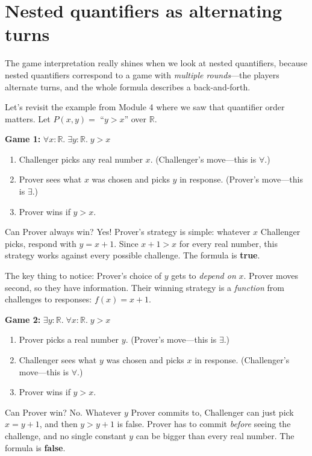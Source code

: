 \documentclass[11pt]{article}
\begin{document}
\section{Nested quantifiers as alternating turns}

The game interpretation really shines when we look at nested quantifiers, because nested quantifiers correspond to a game with \emph{multiple rounds}---the players alternate turns, and the whole formula describes a back-and-forth.

Let's revisit the example from Module 4 where we saw that quantifier order matters. Let $P(x, y) = $ ``$y > x$'' over $\mathbb{R}$.

\medskip
\noindent\textbf{Game 1:} $\forall x : \mathbb{R}.\; \exists y : \mathbb{R}.\; y > x$

\begin{enumerate}
  \item Challenger picks any real number $x$. (Challenger's move---this is $\forall$.)
  \item Prover sees what $x$ was chosen and picks $y$ in response. (Prover's move---this is $\exists$.)
  \item Prover wins if $y > x$.
\end{enumerate}

Can Prover always win? Yes! Prover's strategy is simple: whatever $x$ Challenger picks, respond with $y = x + 1$. Since $x + 1 > x$ for every real number, this strategy works against every possible challenge. The formula is \textbf{true}.

The key thing to notice: Prover's choice of $y$ gets to \emph{depend on} $x$. Prover moves second, so they have information. Their winning strategy is a \emph{function} from challenges to responses: $f(x) = x + 1$.

\medskip
\noindent\textbf{Game 2:} $\exists y : \mathbb{R}.\; \forall x : \mathbb{R}.\; y > x$

\begin{enumerate}
  \item Prover picks a real number $y$. (Prover's move---this is $\exists$.)
  \item Challenger sees what $y$ was chosen and picks $x$ in response. (Challenger's move---this is $\forall$.)
  \item Prover wins if $y > x$.
\end{enumerate}

Can Prover win? No. Whatever $y$ Prover commits to, Challenger can just pick $x = y + 1$, and then $y > y + 1$ is false. Prover has to commit \emph{before} seeing the challenge, and no single constant $y$ can be bigger than every real number. The formula is \textbf{false}.
\end{document}
